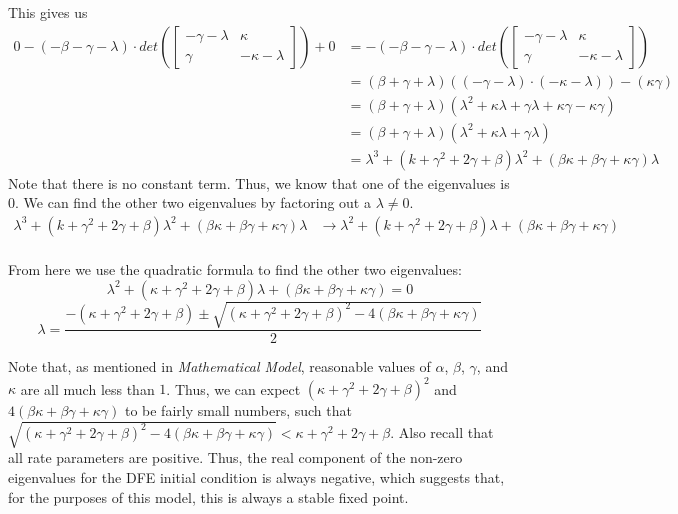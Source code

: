 \documentclass[12pt]{article}
\begin{document}
This gives us
$$
\begin{aligned}
0 - (-\beta - \gamma - \lambda) \cdot det(\begin{bmatrix}
-\gamma - \lambda & \kappa \\
\gamma & -\kappa - \lambda
\end{bmatrix}) + 0 &= - (-\beta - \gamma - \lambda) \cdot det(\begin{bmatrix}
-\gamma - \lambda & \kappa \\
\gamma & -\kappa - \lambda
\end{bmatrix}) \\
&= (\beta + \gamma + \lambda)((-\gamma - \lambda) \cdot (-\kappa - \lambda)) - (\kappa \gamma) \\
&= (\beta + \gamma + \lambda)(\lambda ^2 + \kappa \lambda + \gamma \lambda + \kappa \gamma - \kappa \gamma) \\
&= (\beta + \gamma + \lambda)(\lambda^2 + \kappa \lambda + \gamma \lambda) \\
&= \lambda ^3 + (k + \gamma ^2 + 2\gamma + \beta) \lambda ^2 + (\beta \kappa + \beta \gamma + \kappa \gamma) \lambda
\end{aligned}
$$
Note that there is no constant term. Thus, we know that one of the eigenvalues is $0$. We can find the other two eigenvalues by factoring out a $\lambda \neq 0$. \\
$$
\begin{aligned}
\lambda ^3 + (k + \gamma ^2 + 2\gamma + \beta) \lambda ^2 + (\beta \kappa + \beta \gamma + \kappa \gamma) \lambda & \rightarrow \lambda ^2 + (k + \gamma ^2 + 2\gamma + \beta) \lambda + (\beta \kappa + \beta \gamma + \kappa \gamma) \\
\end{aligned}
$$

From here we use the quadratic formula to find the other two eigenvalues:
$$
\lambda ^2 + (\kappa + \gamma ^2 + 2\gamma + \beta) \lambda + (\beta \kappa + \beta \gamma + \kappa \gamma) = 0
$$
$$
\lambda = \frac{-(\kappa + \gamma ^2 + 2 \gamma + \beta) \pm \sqrt{(\kappa + \gamma^2 + 2\gamma + \beta)^2 - 4(\beta \kappa + \beta \gamma + \kappa \gamma)}}{2}
$$

Note that, as mentioned in \textit{Mathematical Model}, reasonable values of $\alpha$,  $\beta$, $\gamma$, and $\kappa$ are all much less than $1$. Thus, we can expect $(\kappa + \gamma ^2 + 2 \gamma + \beta)^2$ and $4(\beta \kappa + \beta \gamma + \kappa \gamma)$ to be fairly small numbers, such that $\sqrt{(\kappa + \gamma ^2 + 2 \gamma + \beta)^2 - 4(\beta \kappa + \beta \gamma + \kappa \gamma)} < \kappa + \gamma ^2 + 2 \gamma + \beta$. Also recall that all rate parameters are positive. Thus, the real component of the non-zero eigenvalues for the DFE initial condition is always negative, which suggests that, for the purposes of this model, this is always a stable fixed point.
\end{document}
